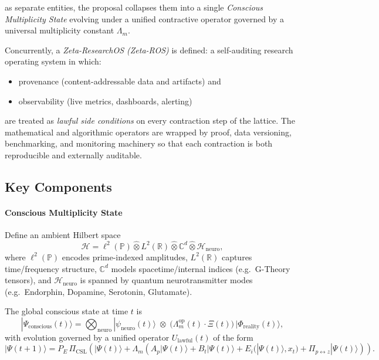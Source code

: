 \documentclass[11pt]{article}
\begin{document}
as separate entities, the proposal collapses them into a single \emph{Conscious Multiplicity State} evolving under a unified contractive operator governed by a universal multiplicity constant $\Lambda_m$.

Concurrently, a \emph{Zeta-ResearchOS (Zeta-ROS)} is defined: a self-auditing research operating system in which:

\begin{itemize}[leftmargin=*]
  \item provenance (content-addressable data and artifacts) and
  \item observability (live metrics, dashboards, alerting)
\end{itemize}

are treated as \emph{lawful side conditions} on every contraction step of the lattice. The mathematical and algorithmic operators are wrapped by proof, data versioning, benchmarking, and monitoring machinery so that each contraction is both reproducible and externally auditable.

\subsection{Key Components}

\paragraph{Conscious Multiplicity State}

Define an ambient Hilbert space
\[
\mathcal{H}
  = \ell^2(\mathbb{P})
    \widehat{\otimes} L^2(\mathbb{R})
    \widehat{\otimes} \mathbb{C}^d
    \widehat{\otimes} \mathcal{H}_{\text{neuro}},
\]
where $\ell^2(\mathbb{P})$ encodes prime-indexed amplitudes, $L^2(\mathbb{R})$ captures time/frequency structure, $\mathbb{C}^d$ models spacetime/internal indices (e.g.\ G-Theory tensors), and $\mathcal{H}_{\text{neuro}}$ is spanned by quantum neurotransmitter modes (e.g.\ Endorphin, Dopamine, Serotonin, Glutamate).

The global conscious state at time $t$ is
\[
|\Psi_{\text{conscious}}(t)\rangle =
\bigotimes_{\text{neuro}} |\psi_{\text{neuro}}(t)\rangle
\;\otimes\;
\bigl(\Lambda_m^{\mathrm{op}}(t)\cdot \Xi(t)\bigr)\,|\Phi_{\text{reality}}(t)\rangle,
\]
with evolution governed by a unified operator $U_{\text{lawful}}(t)$ of the form
\[
|\Psi(t+1)\rangle
  = P_E \,\Pi_{\mathrm{CSL}}\!
      \left(
        |\Psi(t)\rangle
        + \Lambda_m
          \left( A_p|\Psi(t)\rangle
                + B_t|\Psi(t)\rangle
                + E_i(|\Psi(t)\rangle,x_t)
                + \Pi_{p\leftrightarrow z}|\Psi(t)\rangle
          \right)
      \right).
\]
\end{document}
